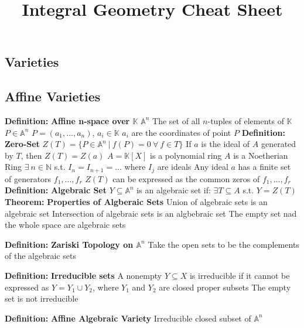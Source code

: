 \documentclass[14pt]{extarticle}
\title{Integral Geometry Cheat Sheet}
\def\Definition{{\color{blue} \textbf{Definition:} }}
\def\Theorem{{\color{red} \textbf{Theorem:} }}
\begin{document}
	\maketitle	
	\begin{outline}	
		\section*{Varieties}
		\subsection*{Affine Varieties}
		\1	\Definition \textbf{Affine n-space over $\mathbb{K}$}
			\2	$\mathbb{A}^n$
			\2	The set of all $n$-tuples of elements of $\mathbb{K}$
				\3	$P \in \mathbb{A}^n$
				\3	$P = (a_1,...,a_n)$, $a_i \in \mathbb{K}$
				\3	$a_i$ are the coordinates of point $P$
		\1	\Definition \textbf{Zero-Set}
			\2	$Z(T) = \{P \in \mathbb{A}^n~|~f(P) = 0~\forall~f \in T\}$
			\2	If $a$ is the ideal of $A$ generated by $T$, then $Z(T) = Z(a)$
				\3	$A = \mathbb{K}[X]$ is a polynomial ring 
				\3	$A$ is a Noetherian Ring
					\4	$\exists~n \in \mathbb{N}$ s.t. $I_n = I_{n+1} = ...$ where $I_j$ are ideals
			\2	Any ideal $a$ has a finite set of generators $f_1,...,f_r$
			\2	$Z(T)$ can be expressed as the common zeros of $f_1,...,f_r$
		\1	\Definition \textbf{Algebraic Set}
			\2	$Y \subseteq \mathbb{A}^n$ is an algebraic set if:
			\2	$\exists T \subseteq A$ s.t. $Y = Z(T)$
		\1	\Theorem \textbf{Properties of Algberaic Sets}
			\2	Union of algebraic sets is an algebraic set
			\2	Intersection of algebraic sets is an algbebraic set
			\2	The empty set nad the whole space are algebraic sets

		\1	\Definition \textbf{Zariski Topology on $\mathbb{A}^n$}
			\2	Take the open sets to be the complements of the algebraic sets

		\1	\Definition \textbf{Irreducible sets}
			\2	A nonempty $Y \subseteq X$ is irreducible if it cannot be expressed
					as $Y = Y_1 \cup Y_2$, where $Y_1$ and $Y_2$ are closed proper subsets
			\2	The empty set is not irreducible

		\1	\Definition \textbf{Affine Algebraic Variety}
			\2	Irreducible closed subset of $\mathbb{A}^n$
		

\end{outline}
\end{document}
